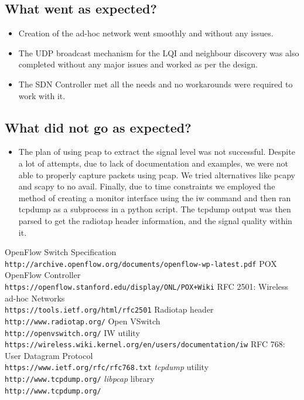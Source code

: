 \documentclass{article}
\begin{document}
\subsection{What went as expected?} 
\begin{itemize}
\item Creation of the ad-hoc network went smoothly and without any issues. 
\item The UDP broadcast mechanism for the LQI and neighbour discovery was also completed without any major issues and
worked as per the design. 
\item The SDN Controller met all the needs and no workarounds were required to work with it.
\end{itemize}
\subsection{What did not go as expected?}
\begin{itemize}
\item The plan of using pcap to extract the signal  level was not successful. Despite a lot of attempts, due to lack of
documentation and examples, we were not able to properly capture packets using pcap. We tried alternatives like pcapy
and scapy to no avail. Finally, due to time constraints we employed the method of creating a monitor interface using the
iw command and then ran tcpdump as a subprocess in a python script. The tcpdump output was then parsed to get the
radiotap header information, and the signal quality within it. 
\end{itemize}
\begin{thebibliography}{5}
OpenFlow Switch Specification
\\\texttt{http://archive.openflow.org/documents/openflow-wp-latest.pdf}
POX OpenFlow Controller
\\\texttt{https://openflow.stanford.edu/display/ONL/POX+Wiki}
RFC 2501: Wireless ad-hoc Networks
\\\texttt{https://tools.ietf.org/html/rfc2501}
Radiotap header
\\\texttt{http://www.radiotap.org/}
\bibitem{}
Open VSwitch
\\\texttt{http://openvswitch.org/}
\bibitem{}
IW utility
\\\texttt{https://wireless.wiki.kernel.org/en/users/documentation/iw}
\bibitem{}
RFC 768: User Datagram Protocol
\\\texttt{https://www.ietf.org/rfc/rfc768.txt}
\bibitem{}
\textit{tcpdump} utility
\\\texttt{http://www.tcpdump.org/}
\bibitem{}
\textit{libpcap} library
\\\texttt{http://www.tcpdump.org/}
\end{thebibliography}
\end{document}
